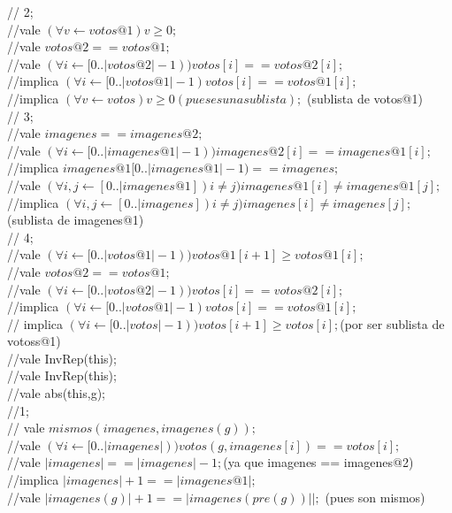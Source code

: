 \documentclass[10pt,a4paper,spanish]{article}
\begin{document}
{\indent // 2; \\
\indent //vale  $( \forall v \leftarrow votos@1) v \geq 0;$ \\
\indent //vale  $votos@2 == votos@1;$ \\
\indent //vale $(\forall i \leftarrow [0..|votos@2|-1)) votos[i] == votos@2[i];$ \\
\indent //implica $(\forall i \leftarrow [0..|votos@1|-1) votos[i] == votos@1[i];$ \\
\indent //implica $ (\forall v \leftarrow votos) v \geq 0 (pues es una sublista);$ (sublista de votos@1) \\

\indent // 3;\\
\indent //vale $imagenes == imagenes@2;$\\
\indent //vale $ (\forall i \leftarrow [0..|imagenes@1|-1)) imagenes@2[i]== imagenes@1[i];$\\
\indent //implica $imagenes@1[0..|imagenes@1|-1) == imagenes;$\\
\indent //vale $(\forall i,j \leftarrow [0..|imagenes@1]) i \neq j) imagenes@1[i] \neq imagenes@1[j];$\\
\indent //implica $(\forall i,j \leftarrow [0..|imagenes]) i \neq j) imagenes[i] \neq imagenes[j];$(sublista de imagenes@1)\\

\indent // 4;\\
\indent //vale  $(\forall i \leftarrow [0..|votos@1|-1)) votos@1[i+1] \geq votos@1[i] ;$\\
\indent //vale  $votos@2 == votos@1;$\\
\indent //vale $(\forall i \leftarrow [0..|votos@2|-1)) votos[i] == votos@2[i];$\\
\indent //implica $(\forall i \leftarrow [0..|votos@1|-1) votos[i] == votos@1[i];$\\
\indent // implica $(\forall i \leftarrow [0..|votos|-1)) votos[i+1] \geq votos[i] ;$(por ser sublista de votoss@1)\\
\indent //vale InvRep(this);\\

\indent //vale InvRep(this);\\
\indent //vale abs(this,g);\\

\indent //1;\\
\indent // vale $mismos(imagenes, imagenes(g));$\\
\indent //vale $(\forall i \leftarrow [0..|imagenes|)) votos(g,imagenes[i])==votos[i];$\\
\indent //vale $|imagenes| == |imagenes|-1;$(ya que imagenes == imagenes@2)\\
\indent //implica $|imagenes|+1 == |imagenes@1|;$\\
\indent //vale $|imagenes(g)|+1 == |imagenes(pre(g))||;$ (pues son mismos)\\

}
\end{document}

